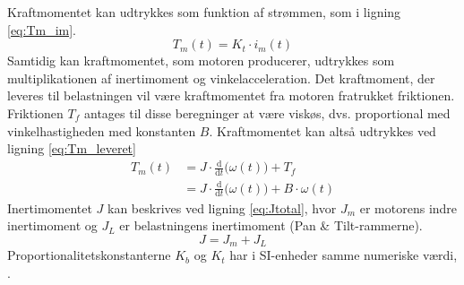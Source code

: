 Kraftmomentet kan udtrykkes som funktion af strømmen, som i ligning \ref{eq:Tm_im}.
\begin{equation}
	T_m\left(t\right)=K_t\cdot{i_m\left(t\right)}
	\label{eq:Tm_im} 
 \end{equation}
Samtidig kan kraftmomentet, som motoren producerer, udtrykkes som multiplikationen af inertimoment og vinkelacceleration.
Det kraftmoment, der leveres til belastningen vil være kraftmomentet fra motoren fratrukket friktionen.
Friktionen \(T_f\) antages til disse beregninger at være viskøs, dvs. proportional med vinkelhastigheden med konstanten \(B\).
Kraftmomentet kan altså udtrykkes ved ligning \ref{eq:Tm_leveret}
\begin{align}
	T_m\left(t\right)&=J\cdot\frac{\mathrm d}{\mathrm d t} \big(\omega\left(t\right) \big)+T_f\\
		&=J\cdot\frac{\mathrm d}{\mathrm d t} \big(\omega\left(t\right) \big)+B\cdot\omega\left(t\right)
	\label{eq:Tm_leveret} 
 \end{align}
Inertimomentet \(J\) kan beskrives ved ligning \ref{eq:Jtotal}, hvor \(J_m\) er motorens indre inertimoment og \(J_L\)
er belastningens inertimoment (Pan \& Tilt-rammerne).
\begin{equation}
	J=J_m+J_L
	\label{eq:Jtotal} 
 \end{equation}
Proportionalitetskonstanterne \(K_b\) og \(K_t\) har i SI-enheder samme numeriske værdi, \citep[Physical setup]{matlabdcmodel}.

